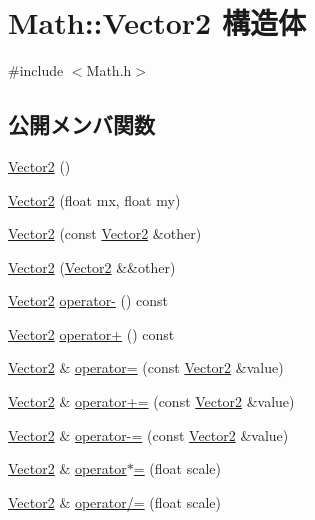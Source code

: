 \hypertarget{struct_math_1_1_vector2}{}\section{Math\+:\+:Vector2 構造体}
\label{struct_math_1_1_vector2}


{\ttfamily \#include $<$Math.\+h$>$}

\subsection*{公開メンバ関数}
\begin{DoxyCompactItemize}
\item 
\mbox{\hyperlink{struct_math_1_1_vector2_a22104d1809be26a419ef1f959e3761bf}{Vector2}} ()
\item 
\mbox{\hyperlink{struct_math_1_1_vector2_a86e30f36645e679633abd3d9c7f7b4a0}{Vector2}} (float mx, float my)
\item 
\mbox{\hyperlink{struct_math_1_1_vector2_ac0c70e89b089fb619dae62c32ccde4ec}{Vector2}} (const \mbox{\hyperlink{struct_math_1_1_vector2}{Vector2}} \&other)
\item 
\mbox{\hyperlink{struct_math_1_1_vector2_ac32bb79e657bfbb7553b56a45dfb9ed8}{Vector2}} (\mbox{\hyperlink{struct_math_1_1_vector2}{Vector2}} \&\&other)
\item 
\mbox{\hyperlink{struct_math_1_1_vector2}{Vector2}} \mbox{\hyperlink{struct_math_1_1_vector2_a66c2a54ca378d0d665bbb1115b2576f7}{operator-\/}} () const
\item 
\mbox{\hyperlink{struct_math_1_1_vector2}{Vector2}} \mbox{\hyperlink{struct_math_1_1_vector2_aae50f88b9003b10306729dab396e3a23}{operator+}} () const
\item 
\mbox{\hyperlink{struct_math_1_1_vector2}{Vector2}} \& \mbox{\hyperlink{struct_math_1_1_vector2_a89e1656f8a3a65c531a06fc80e441008}{operator=}} (const \mbox{\hyperlink{struct_math_1_1_vector2}{Vector2}} \&value)
\item 
\mbox{\hyperlink{struct_math_1_1_vector2}{Vector2}} \& \mbox{\hyperlink{struct_math_1_1_vector2_a85f904ab72479fc117ded19692e480cd}{operator+=}} (const \mbox{\hyperlink{struct_math_1_1_vector2}{Vector2}} \&value)
\item 
\mbox{\hyperlink{struct_math_1_1_vector2}{Vector2}} \& \mbox{\hyperlink{struct_math_1_1_vector2_a117d7c2a1ba2e9cc918ecb10d7656161}{operator-\/=}} (const \mbox{\hyperlink{struct_math_1_1_vector2}{Vector2}} \&value)
\item 
\mbox{\hyperlink{struct_math_1_1_vector2}{Vector2}} \& \mbox{\hyperlink{struct_math_1_1_vector2_a1b94260716b3a0b8552276c46faba5c5}{operator$\ast$=}} (float scale)
\item 
\mbox{\hyperlink{struct_math_1_1_vector2}{Vector2}} \& \mbox{\hyperlink{struct_math_1_1_vector2_aa273b2243920d3d13f2298e33e8e8d03}{operator/=}} (float scale)
\end{DoxyCompactItemize}
